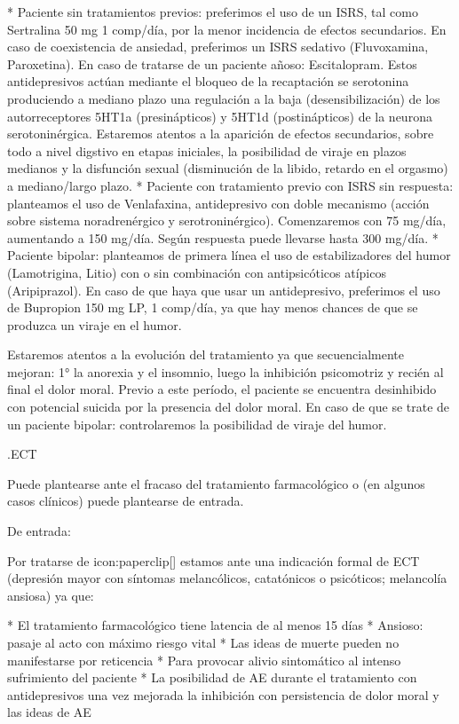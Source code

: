 \documentclass[encares.tex]{subfiles}
\begin{document}
* Paciente sin tratamientos previos: preferimos el uso de un ISRS, tal como Sertralina 50 mg 1 comp/día, por la menor incidencia de efectos secundarios. En caso de coexistencia de ansiedad, preferimos un ISRS sedativo (Fluvoxamina, Paroxetina). En caso de tratarse de un paciente añoso: Escitalopram. Estos antidepresivos actúan mediante el bloqueo de la recaptación se serotonina produciendo a mediano plazo una regulación a la baja (desensibilización) de los autorreceptores 5HT1a (presinápticos) y 5HT1d (postinápticos) de la neurona serotoninérgica. Estaremos atentos a la aparición de efectos secundarios, sobre todo a nivel digstivo en etapas iniciales, la posibilidad de viraje en plazos medianos y la disfunción sexual (disminución de la libido, retardo en el orgasmo) a mediano/largo plazo.
* Paciente con tratamiento previo con ISRS sin respuesta: planteamos el uso de Venlafaxina, antidepresivo con doble mecanismo (acción sobre sistema noradrenérgico y serotroninérgico). Comenzaremos con 75 mg/día, aumentando a 150 mg/día. Según respuesta puede llevarse hasta 300 mg/día.
* Paciente bipolar: planteamos de primera línea el uso de estabilizadores del humor (Lamotrigina, Litio) con o sin combinación con antipsicóticos atípicos (Aripiprazol). En caso de que haya que usar un antidepresivo, preferimos el uso de Bupropion 150 mg LP, 1 comp/día, ya que hay menos chances de que se produzca un viraje en el humor.

Estaremos atentos a la evolución del tratamiento ya que secuencialmente mejoran: 1° la anorexia y el insomnio, luego la inhibición psicomotriz y recién al final el dolor moral. Previo a este período, el paciente se encuentra desinhibido con potencial suicida por la presencia del dolor moral. En caso de que se trate de un paciente bipolar: controlaremos la posibilidad de viraje del humor.

.ECT

Puede plantearse ante el fracaso del tratamiento farmacológico o (en algunos casos clínicos) puede plantearse de entrada.

De entrada:

Por tratarse de icon:paperclip[] estamos ante una indicación formal de ECT (depresión mayor con síntomas melancólicos, catatónicos o psicóticos; melancolía ansiosa) ya que:

* El tratamiento farmacológico tiene latencia de al menos 15 días
* Ansioso: pasaje al acto con máximo riesgo vital
* Las ideas de muerte pueden no manifestarse por reticencia
* Para provocar alivio sintomático al intenso sufrimiento del paciente
* La posibilidad de AE durante el tratamiento con antidepresivos una vez mejorada la inhibición con persistencia de dolor moral y las ideas de AE
\end{document}
